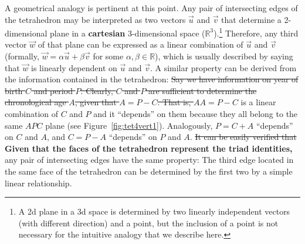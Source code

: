 \documentclass[12pt,oneside,letter]{article} %
\newcommand\vt[1]{\textcolor{rd}{#1}}
\begin{document}

A geometrical analogy is pertinent at this point. Any pair of intersecting edges
of the tetrahedron may be interpreted as two vectors $\vec{u}$ and $\vec{v}$
that determine a 2-dimensional plane in a \textbf{cartesian} 3-dimensional
space ($\mathbb{R}^3$).\footnote{A 2d plane in a 3d space is determined by two linearly independent
vectors (with different direction) and a point, but the inclusion of a point is not
necessary for the intuitive analogy that we describe here.} Therefore, any third
vector $\vec{w}$ of that plane can be expressed as a linear combination of
$\vec{u}$ and $\vec{v}$ (formally, $\vec{w}=\alpha\vec{u}+\beta\vec{v}$ for some $\alpha, \beta \in \mathbb{R}$), which is usually
described by saying that $\vec{w}$ is linearly dependent on $\vec{u}$ and
$\vec{v}$.
A similar property can be derived from the information contained in the
tetrahedron: \sout{Say we have information on year of birth $C$ and period $P$. Clearly, $C$ and $P$ are sufficient to determine the chronological age $A$, given that  $A=P-C$. That is, $A$}\textbf{$A=P-C$} is a linear combination of $C$ and $P$ and it ``depends'' on them because they all belong to the same $APC$ plane (see Figure~\ref{fig:tet4vert1}). Analogously, $P=C+A$ ``depends'' on $C$ and $A$, and $C=P-A$ ``depends'' on $P$ and $A$. \sout{It can be easily verified that } \textbf{Given that the faces of the tetrahedron represent the triad identities, } any pair of intersecting edges have the same property: The third edge located in the same face of the tetrahedron can be determined by the first two by a simple linear relationship.
\end{document}
